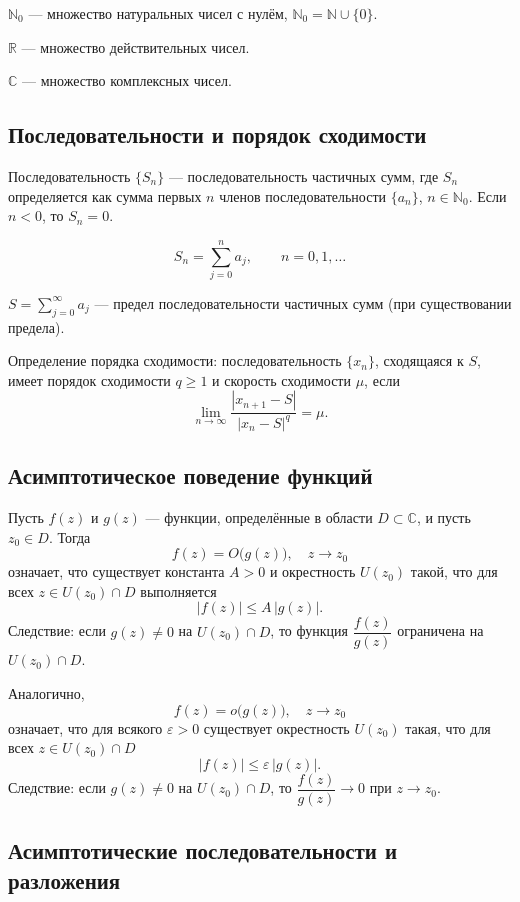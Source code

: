 \documentclass[14pt, a4paper]{extarticle}
\theoremstyle{definition}
\theoremstyle{remark}
\begin{document}
\(\mathbb{N}_0\) — множество натуральных чисел с нулём, \(\mathbb{N}_0=\mathbb{N}\cup\{0\}\).

\(\mathbb{R}\) — множество действительных чисел.

\(\mathbb{C}\) — множество комплексных чисел.

\subsection*{Последовательности и порядок сходимости}

Последовательность \(\{S_n\}\) — последовательность частичных сумм, где \(S_n\) определяется как сумма первых \(n\) членов последовательности \(\{a_n\}\), \(n\in\mathbb{N}_0\). Если \(n<0\), то \(S_n=0\).

\[
S_n=\sum_{j=0}^{n} a_j,\qquad n=0,1,\dots
\]

\(S=\sum_{j=0}^{\infty} a_j\) — предел последовательности частичных сумм (при существовании предела).

Определение порядка сходимости: последовательность \(\{x_n\}\), сходящаяся к \(S\), имеет порядок сходимости \(q\ge 1\) и скорость сходимости \(\mu\), если
\[
\lim_{n\to\infty}\frac{|x_{n+1}-S|}{|x_n-S|^q}=\mu.
\]

\subsection*{Асимптотическое поведение функций}

Пусть \(f(z)\) и \(g(z)\) — функции, определённые в области \(D\subset\mathbb{C}\), и пусть \(z_0\in D\). Тогда
\[
f(z)=O\bigl(g(z)\bigr),\quad z\to z_0
\]
означает, что существует константа \(A>0\) и окрестность \(U(z_0)\) такой, что для всех \(z\in U(z_0)\cap D\) выполняется
\[
|f(z)|\le A\,|g(z)|.
\]
Следствие: если \(g(z)\neq 0\) на \(U(z_0)\cap D\), то функция \(\dfrac{f(z)}{g(z)}\) ограничена на \(U(z_0)\cap D\).

Аналогично,\
$$
f(z)=o\bigl(g(z)\bigr),\quad z\to z_0
$$
означает, что для всякого \(\varepsilon>0\) существует окрестность \(U(z_0)\) такая, что для всех \(z\in U(z_0)\cap D\)
\[
|f(z)|\le \varepsilon\,|g(z)|.
\]
Следствие: если \(g(z)\neq 0\) на \(U(z_0)\cap D\), то \(\dfrac{f(z)}{g(z)}\to 0\) при \(z\to z_0\).

\subsection*{Асимптотические последовательности и разложения}
\end{document}
